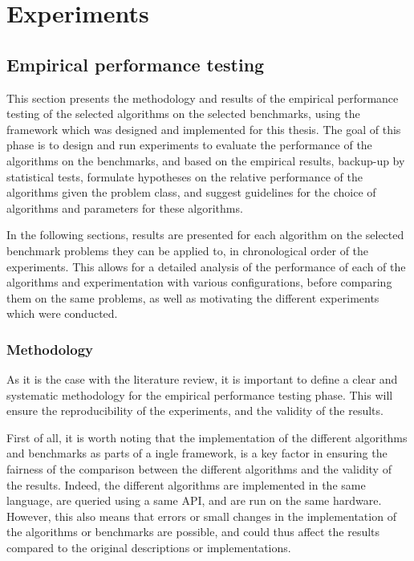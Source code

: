 \chapter{Experiments}
\label{chap:experiments}

\section{Empirical performance testing}

This section presents the methodology and results of the empirical performance testing of the selected algorithms on the selected benchmarks, using the framework which was designed and implemented for this thesis.
The goal of this phase is to design and run experiments to evaluate the performance of the algorithms on the benchmarks, and based on the empirical results, backup-up by statistical tests, formulate hypotheses on
the relative performance of the algorithms given the problem class, and suggest guidelines for the choice of algorithms and parameters for these algorithms.

In the following sections, results are presented for each algorithm on the selected benchmark problems they can be applied to, in chronological order of the experiments.
This allows for a detailed analysis of the performance of each of the algorithms and experimentation with various configurations, before comparing them on the same problems, as well as
motivating the different experiments which were conducted.

\subsection{Methodology}

As it is the case with the literature review, it is important to define a clear and systematic methodology for the empirical performance testing phase. This will ensure the reproducibility of the experiments,
and the validity of the results.

First of all, it is worth noting that the implementation of the different algorithms and benchmarks as parts of a ingle framework, is a key factor in ensuring the fairness of the comparison between the different
algorithms and the validity of the results. Indeed, the different algorithms are implemented in the same language, are queried using a same API, and are run on the same hardware. However, this also means that
errors or small changes in the implementation of the algorithms or benchmarks are possible, and could thus affect the results compared to the original descriptions or implementations.

